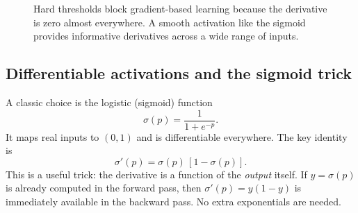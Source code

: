 \begin{figure}[t]
    \centering
    \caption{Hard thresholds block gradient-based learning because the derivative is zero almost everywhere. A smooth activation like the sigmoid provides informative derivatives across a wide range of inputs.}
    \label{fig:mlp_step_vs_sigmoid}
\end{figure}


\subsection{Differentiable activations and the sigmoid trick}
\label{sec:mlp_differentiable_activations_and_the_sigmoid_trick}

A classic choice is the logistic (sigmoid) function
\begin{equation}
\sigma(p) = \frac{1}{1+e^{-p}}.
\label{eq:sigmoid}
\end{equation}
It maps real inputs to $(0,1)$ and is differentiable everywhere. The key identity is
\begin{equation}
\sigma'(p) = \sigma(p)\,[1-\sigma(p)].
\label{eq:sigmoid_derivative}
\end{equation}
This is a useful trick: the derivative is a function of the \emph{output} itself. If $y=\sigma(p)$ is already computed in the forward pass, then $\sigma'(p)=y(1-y)$ is immediately available in the backward pass. No extra exponentials are needed.

